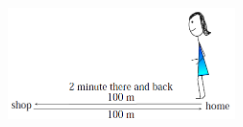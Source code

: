 \begin{enumerate}[noitemsep, label=\textbf{\arabic*}. ]
    \setcounter{subfigure}{0}


	\begin{figure}[H] %
    \begin{center}
    \label{m38791*id66785!!!underscore!!!media}\label{m38791*id66785!!!underscore!!!printimage}\includegraphics[width=6cm]{col11305.imgs/m38791_PG10C2_016.png} %
        
      \vspace{2pt}
    \vspace{.1in}
    
    \end{center}

 \end{figure}   


\end{enumerate}
